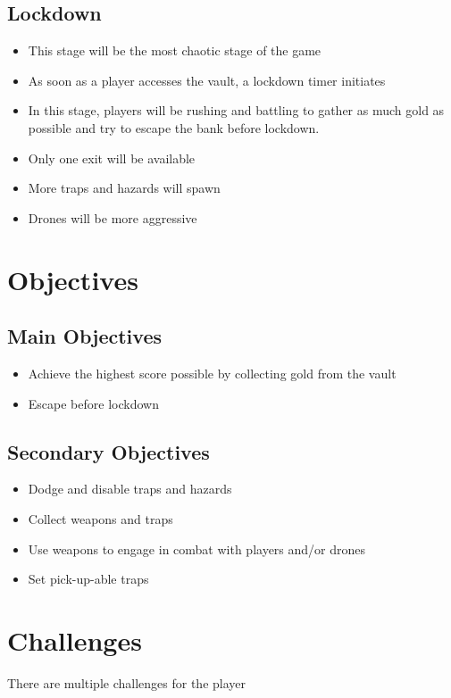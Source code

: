 \documentclass[14pt]{report}
\begin{document}
\subsection{Lockdown}
\begin{itemize}
    \item This stage will be the most chaotic stage of the game
    \item As soon as a player accesses the vault, a lockdown timer initiates
    \item In this stage, players will be rushing and battling to gather as much gold as possible and try to escape the bank before lockdown.
    \item Only one exit will be available
    \item More traps and hazards will spawn
    \item Drones will be more aggressive
\end{itemize}

\section{Objectives}
\subsection{Main Objectives}
\begin{itemize}
    \item Achieve the highest score possible by collecting gold from the vault
    \item Escape before lockdown
\end{itemize}
\subsection{Secondary Objectives}
\begin{itemize}
    \item Dodge and disable traps and hazards
    \item Collect weapons and traps
    \item Use weapons to engage in combat with players and/or drones
    \item Set pick-up-able traps
\end{itemize}

\section{Challenges}
There are multiple challenges for the player
\end{document}
